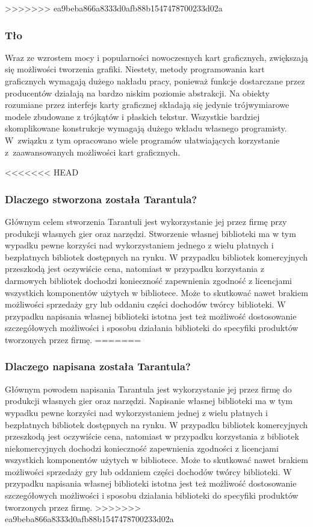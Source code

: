 \documentclass[11pt,leqno]{article}
\begin{document}
>>>>>>> ea9beba866a8333d0afb88b1547478700233d02a
\subsubsection{Tło}
\noindent
Wraz ze wzrostem mocy i popularności nowoczesnych kart graficznych, zwiększają się możliwości tworzenia grafiki. 
Niestety, metody programowania kart graficznych wymagają dużego nakładu pracy, ponieważ funkcje dostarczane przez producentów 
działają na bardzo niskim poziomie abstrakcji. Na obiekty rozumiane przez interfejs karty graficznej składają się jedynie trójwymiarowe modele zbudowane z trójkątów i płaskich tekstur. 
Wszystkie bardziej skomplikowane konstrukcje wymagają dużego wkładu własnego programisty. W~związku z tym opracowano wiele programów 
ułatwiających korzystanie z~zaawansowanych możliwości kart graficznych. 

<<<<<<< HEAD
\subsubsection{Dlaczego stworzona została Tarantula?}
\noindent
Głównym celem stworzenia Tarantuli jest wykorzystanie jej przez firmę przy produkcji własnych gier oraz narzędzi. 
Stworzenie własnej biblioteki ma w tym wypadku pewne korzyści nad wykorzystaniem jednego z wielu płatnych i bezpłatnych bibliotek 
dostępnych na rynku. W przypadku bibliotek komercyjnych przeszkodą jest oczywiście cena, natomiast w przypadku korzystania z darmowych 
bibliotek dochodzi konieczność zapewnienia zgodność z licencjami wszystkich komponentów użytych w bibliotece. Może to skutkować nawet 
brakiem możliwości sprzedaży gry lub oddaniu części dochodów twórcy biblioteki. W przypadku napisania własnej biblioteki istotna jest też możliwość dostosowanie szczegółowych 
możliwości i sposobu działania biblioteki do specyfiki produktów tworzonych przez firmę.
=======
\subsubsection{Dlaczego napisana została Tarantula?}
\noindent
Głównym powodem napisania Tarantula jest wykorzystanie jej przez firmę do produkcji własnych gier oraz narzędzi. 
Napisanie własnej biblioteki ma w tym wypadku pewne korzyści nad wykorzystaniem jednej z wielu płatnych i bezpłatnych bibliotek 
dostępnych na rynku. W przypadku bibliotek komercyjnych przeszkodą jest oczywiście cena, natomiast w przypadku korzystania z bibliotek niekomercyjnych dochodzi konieczność zapewnienia zgodności z licencjami wszystkich komponentów użytych w bibliotece. Może to skutkować nawet 
brakiem możliwości sprzedaży gry lub oddaniem części dochodów twórcy biblioteki. W przypadku napisania własnej biblioteki istotna jest też możliwość dostosowanie szczegółowych 
możliwości i sposobu działania biblioteki do specyfiki produktów tworzonych przez firmę.
>>>>>>> ea9beba866a8333d0afb88b1547478700233d02a
\end{document}
